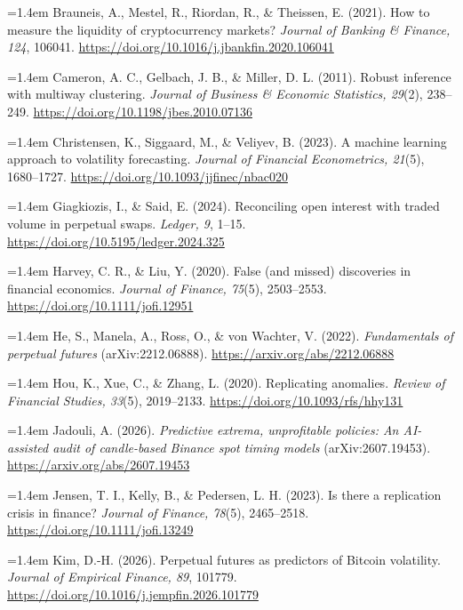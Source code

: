 \documentclass[11pt,a4paper]{article}
\begin{document}
{\small\raggedright\setlength{\parskip}{0.5em}
\noindent\hangindent=1.4em Brauneis, A., Mestel, R., Riordan, R., \& Theissen, E. (2021). How to measure the liquidity of cryptocurrency markets? \emph{Journal of Banking \& Finance, 124}, 106041. \url{https://doi.org/10.1016/j.jbankfin.2020.106041}

\noindent\hangindent=1.4em Cameron, A. C., Gelbach, J. B., \& Miller, D. L. (2011). Robust inference with multiway clustering. \emph{Journal of Business \& Economic Statistics, 29}(2), 238--249. \url{https://doi.org/10.1198/jbes.2010.07136}

\noindent\hangindent=1.4em Christensen, K., Siggaard, M., \& Veliyev, B. (2023). A machine learning approach to volatility forecasting. \emph{Journal of Financial Econometrics, 21}(5), 1680--1727. \url{https://doi.org/10.1093/jjfinec/nbac020}

\noindent\hangindent=1.4em Giagkiozis, I., \& Said, E. (2024). Reconciling open interest with traded volume in perpetual swaps. \emph{Ledger, 9}, 1--15. \url{https://doi.org/10.5195/ledger.2024.325}

\noindent\hangindent=1.4em Harvey, C. R., \& Liu, Y. (2020). False (and missed) discoveries in financial economics. \emph{Journal of Finance, 75}(5), 2503--2553. \url{https://doi.org/10.1111/jofi.12951}

\noindent\hangindent=1.4em He, S., Manela, A., Ross, O., \& von Wachter, V. (2022). \emph{Fundamentals of perpetual futures} (arXiv:2212.06888). \url{https://arxiv.org/abs/2212.06888}

\noindent\hangindent=1.4em Hou, K., Xue, C., \& Zhang, L. (2020). Replicating anomalies. \emph{Review of Financial Studies, 33}(5), 2019--2133. \url{https://doi.org/10.1093/rfs/hhy131}

\noindent\hangindent=1.4em Jadouli, A. (2026). \emph{Predictive extrema, unprofitable policies: An AI-assisted audit of candle-based Binance spot timing models} (arXiv:2607.19453). \url{https://arxiv.org/abs/2607.19453}

\noindent\hangindent=1.4em Jensen, T. I., Kelly, B., \& Pedersen, L. H. (2023). Is there a replication crisis in finance? \emph{Journal of Finance, 78}(5), 2465--2518. \url{https://doi.org/10.1111/jofi.13249}

\noindent\hangindent=1.4em Kim, D.-H. (2026). Perpetual futures as predictors of Bitcoin volatility. \emph{Journal of Empirical Finance, 89}, 101779. \url{https://doi.org/10.1016/j.jempfin.2026.101779}

}
\end{document}

